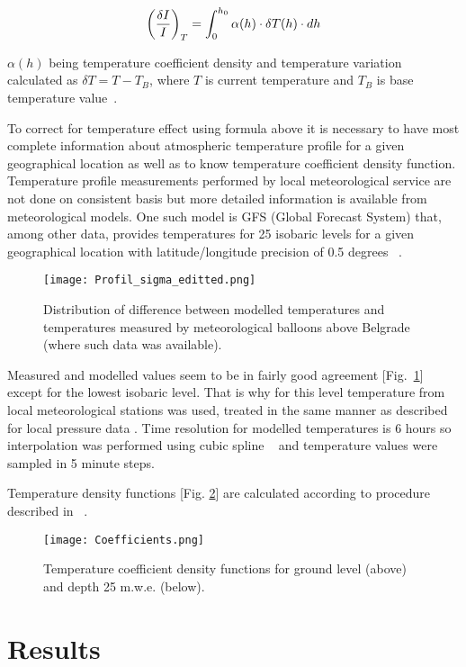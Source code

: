 \documentclass[twocolumn,twoside,slac_two]{revtex4}
\begin{document}
\begin{equation}\label{eq:units}
\left({\delta I\over I}\right)_T = \int_{0}^{h_0} \alpha (h) \cdot \delta T(h) \cdot dh
\end{equation}

$\alpha (h)$ being temperature coefficient density and temperature variation calculated as
$\delta T = T - T_B$, where $T$ is current temperature and $T_B$ is base temperature value~\cite{ref-3}.

To correct for temperature effect using formula above it is necessary to have most complete information about atmospheric temperature profile for a given geographical location as well as to know temperature coefficient density function. Temperature profile measurements performed by local meteorological service are not done on consistent basis but more detailed information is available from meteorological models. One such model is GFS (Global Forecast System) that, among other data, provides temperatures for 25 isobaric levels for a given geographical location with latitude/longitude precision of 0.5 degrees ~\cite{ref-3}. 

\begin{figure}[h]
\centering
\texttt{[image: Profil\_sigma\_editted.png]}
\caption{Distribution of difference between modelled temperatures and temperatures measured by meteorological balloons above Belgrade (where such data was available).} 
\label{Profile_sigma}
\end{figure}

Measured and modelled values seem to be in fairly good agreement [Fig.~\ref{Profile_sigma}] except for the lowest isobaric level. That is why for this level temperature from local meteorological stations was used, treated in the same manner as described for local pressure data . Time resolution for modelled temperatures is 6 hours so interpolation was performed using cubic spline ~\cite{ref-3} and temperature values were sampled in 5 minute steps.

Temperature density functions [Fig. \ref{Coefficients}] are calculated according to procedure described in ~\cite{ref-2}. 

\begin{figure}[h]
\centering
\texttt{[image: Coefficients.png]}
\caption{Temperature coefficient density functions for ground level (above) and depth 25 m.w.e. (below).} 
\label{Coefficients}
\end{figure}

\section{Results}
\end{document}
